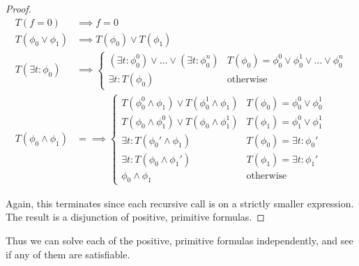 \begin{proof}
  \begin{align*}
    T(f = 0) &\implies f = 0 \\
    T(\phi_{0} \lor \phi_{1}) &\implies T(\phi_{0}) \lor T(\phi_{1}) \\
    T(\exists t : \phi_{0}) &\implies \begin{cases}
                                        (\exists t : \phi_{0}^{0}) \lor \dots \lor (\exists t : \phi_{0}^{n}) & T(\phi_{0}) = \phi_{0}^{0} \lor \phi_{0}^{1} \lor \dots \lor \phi_{0}^{n} \\
                                        \exists t : T(\phi_{0}) & \text{otherwise}
                                      \end{cases} \\
    T(\phi_{0} \land \phi_{1}) &= \implies \begin{cases}
                                             T(\phi_{0}^{0} \land \phi_{1}) \lor T(\phi_{0}^{1} \land \phi_{1}) & T(\phi_{0}) = \phi_{0}^{0} \lor \phi_{0}^{1} \\
                                             T(\phi_{0} \land \phi_{1}^{0}) \lor T(\phi_{0} \land \phi_{1}^{1}) & T(\phi_{1}) = \phi_{1}^{0} \lor \phi_{1}^{1} \\
                                             \exists t : T(\phi_{0}' \land \phi_{1}) & T(\phi_{0}) = \exists t : \phi_{0}' \\
                                             \exists t : T(\phi_{0} \land \phi_{1}') & T(\phi_{1}) = \exists t : \phi_{1}' \\
                                             \phi_{0} \land \phi_{1} & \text{otherwise}
                                           \end{cases}
  \end{align*}

  Again, this terminates since each recursive call is on a strictly smaller expression. The result is a disjunction of positive, primitive formulas.
\end{proof}

Thus we can solve each of the positive, primitive formulas independently, and see if any of them are satisfiable.

